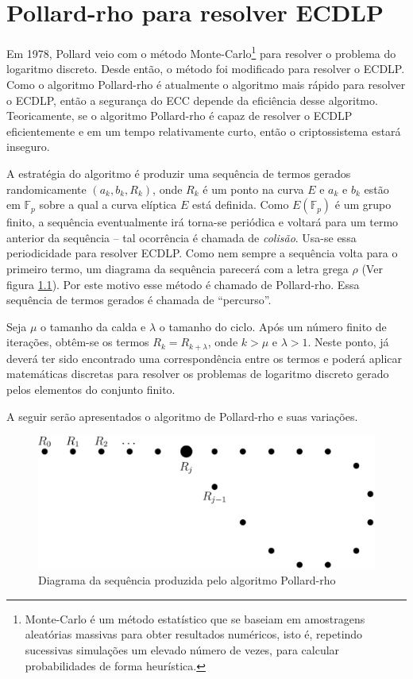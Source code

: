 \chapter{Pollard-rho para resolver ECDLP}
Em 1978, Pollard veio com o método Monte-Carlo\footnote{Monte-Carlo é um método estatístico que se baseiam em amostragens aleatórias massivas para obter resultados numéricos, isto é, repetindo sucessivas simulações um elevado número de vezes, para calcular probabilidades de forma heurística.} para resolver o problema do logaritmo discreto. Desde então, o método foi modificado para resolver o ECDLP. Como o algoritmo Pollard-rho é atualmente o algoritmo mais rápido para resolver o ECDLP, então a segurança do ECC depende da eficiência desse algoritmo. Teoricamente, se o algoritmo Pollard-rho é capaz de resolver o ECDLP eficientemente e em um tempo relativamente curto, então o criptossistema estará inseguro. \cite{Mandy:2007}

A estratégia do algoritmo é produzir uma sequência de termos gerados randomicamente $(a_k, b_k, R_k)$, onde \(R_k\) é um ponto na curva \(E\) e \(a_k\)  e \(b_k\) estão em $\mathbb{F}_p$ sobre a qual a curva elíptica \(E\) está definida. Como $E(\mathbb{F}_p)$ é um grupo finito, a sequência eventualmente irá torna-se periódica e voltará para um termo anterior da sequência \--- tal ocorrência é chamada de \textit{colisão}. Usa-se essa periodicidade para resolver ECDLP. Como nem sempre a sequência volta para o primeiro termo, um diagrama da sequência parecerá com a letra grega \(\rho\) (Ver figura \ref{fig:rho}). Por este motivo esse método é chamado de Pollard-rho. Essa sequência de termos gerados é chamada de ``percurso''.

Seja \(\mu\) o tamanho da calda e \(\lambda\) o tamanho do ciclo. Após um número finito de iterações, obtêm-se os termos $R_k = R_{k+\lambda}$, onde $k > \mu$ e $\lambda > 1$. Neste ponto, já deverá ter sido encontrado uma correspondência entre os termos e poderá aplicar matemáticas discretas para resolver os problemas de logaritmo discreto gerado pelos elementos do conjunto finito.

A seguir serão apresentados o algoritmo de Pollard-rho e suas variações.

\begin{figure}[h]
\centering
\includegraphics[scale=0.4, bb=0 0 888 376]{figuras/rho.eps}
\caption{Diagrama da sequência produzida pelo algoritmo Pollard-rho}
\label{fig:rho}
\end{figure}


